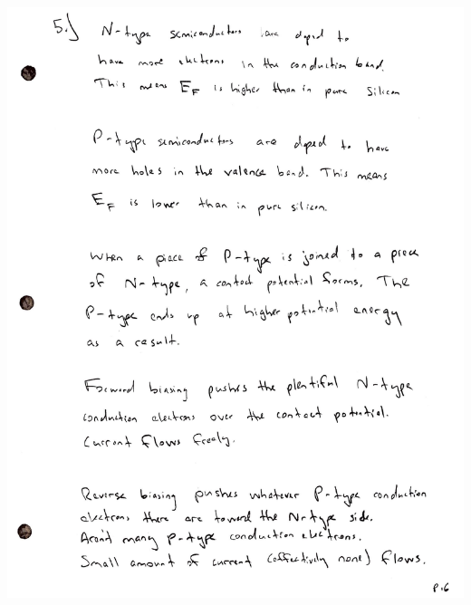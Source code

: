 \documentclass[0pt]{report}
\begin{document}
\begin{multicols*}{3}
\begin{flushleft}
\includegraphics[scale=.31]{exam14.pdf}
\end{flushleft}
\end{multicols*}
\end{document}
